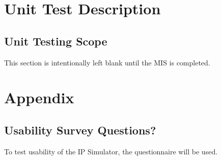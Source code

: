 \documentclass[12pt, titlepage]{article}
\begin{document}
\section{Unit Test Description}


\subsection{Unit Testing Scope}
This section is intentionally left blank until the MIS is completed.

				




\newpage

\section{Appendix\label{appendix}}

\subsection{Usability Survey Questions?}
To test usability of the IP Simulator, the questionnaire \cite{hinderks_schrepp_thomaschewski} will be used.
\newpage{}
\end{document}
